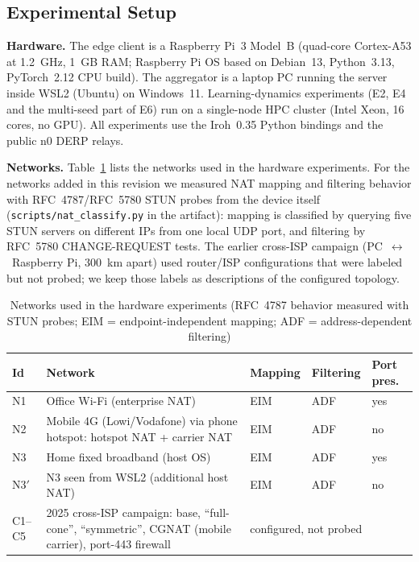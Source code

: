 \subsection{Experimental Setup}
\label{sec:setup}

\textbf{Hardware.} The edge client is a Raspberry Pi~3 Model~B (quad-core Cortex-A53 at 1.2~GHz, 1~GB RAM; Raspberry Pi OS based on Debian~13, Python~3.13, PyTorch~2.12 CPU build). The aggregator is a laptop PC running the server inside WSL2 (Ubuntu) on Windows~11. Learning-dynamics experiments (E2, E4 and the multi-seed part of E6) run on a single-node HPC cluster (Intel Xeon, 16 cores, no GPU). All experiments use the Iroh~0.35 Python bindings and the public n0 DERP relays.

\textbf{Networks.} Table~\ref{tab:networks} lists the networks used in the hardware experiments. For the networks added in this revision we measured NAT mapping and filtering behavior with RFC~4787/RFC~5780 STUN probes from the device itself (\texttt{scripts/nat\_classify.py} in the artifact): mapping is classified by querying five STUN servers on different IPs from one local UDP port, and filtering by RFC~5780 CHANGE-REQUEST tests. The earlier cross-ISP campaign (PC~$\leftrightarrow$~Raspberry Pi, 300~km apart) used router/ISP configurations that were labeled but not probed; we keep those labels as descriptions of the configured topology.

\begin{table}[t]
\centering
\caption{Networks used in the hardware experiments (RFC~4787 behavior measured with STUN probes; EIM = endpoint-independent mapping; ADF = address-dependent filtering)}
\label{tab:networks}
\scriptsize
\setlength{\tabcolsep}{2.5pt}
\begin{tabular}{@{}l p{3.0cm} l l l@{}}
\toprule
\textbf{Id} & \textbf{Network} & \textbf{Mapping} & \textbf{Filtering} & \textbf{Port pres.} \\
\midrule
N1 & Office Wi-Fi (enterprise NAT) & EIM & ADF & yes \\
N2 & Mobile 4G (Lowi/Vodafone) via phone hotspot: hotspot NAT + carrier NAT & EIM & ADF & no \\
N3 & Home fixed broadband (host OS) & EIM & ADF & yes \\
N3$'$ & N3 seen from WSL2 (additional host NAT) & EIM & ADF & no \\
\midrule
C1--C5 & 2025 cross-ISP campaign: base, ``full-cone'', ``symmetric'', CGNAT (mobile carrier), port-443 firewall & \multicolumn{3}{l}{configured, not probed} \\
\bottomrule
\end{tabular}
\end{table}

